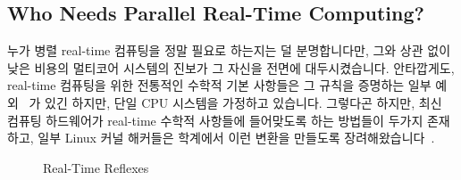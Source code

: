 \subsection{Who Needs Parallel Real-Time Computing?}
\label{sec:advsync:Who Needs Parallel Real-Time Computing?}
누가 병렬 real-time 컴퓨팅을 정말 필요로 하는지는 덜 분명합니다만, 그와 상관
없이 낮은 비용의 멀티코어 시스템의 진보가 그 자신을 전면에 대두시켰습니다.
안타깝게도, real-time 컴퓨팅을 위한 전통적인 수학적 기본 사항들은 그 규칙을
증명하는 일부 예외~\cite{BjoernBrandenburgPhD} 가 있긴 하지만, 단일 CPU
시스템을 가정하고 있습니다.
그렇다곤 하지만, 최신 컴퓨팅 하드웨어가 real-time 수학적 사항들에 들어맞도록
하는 방법들이 두가지 존재하고, 일부 Linux 커널 해커들은 학계에서 이런 변환을
만들도록 장려해왔습니다~\cite{ThomasGleixner2010AcademiaVsReality}.

\begin{figure}[tb]
\centering
{}
\caption{Real-Time Reflexes}
\label{fig:advsync:Real-Time Reflexes}
\end{figure}

